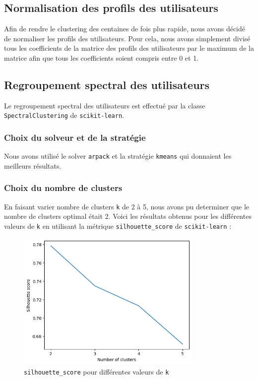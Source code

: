 \documentclass{article}
\begin{document}
\subsection{Normalisation des profils des utilisateurs}
Afin de rendre le clustering des centaines de fois plus rapide, nous avons
décidé de normaliser les profils des utilisateurs. Pour cela, nous avons
simplement divisé tous les coefficients de la matrice des profils des utilisateurs
par le maximum de la matrice afin que tous les coefficients soient compris
entre 0 et 1.

\subsection{Regroupement spectral des utilisateurs}
Le regroupement spectral des utilisateurs est effectué par la classe
\texttt{SpectralClustering} de \texttt{scikit-learn}. 

\subsubsection{Choix du solveur et de la stratégie}
Nous avons utilisé le solver
\texttt{arpack} et la stratégie \texttt{kmeans} qui donnaient les meilleurs
résultats.

\subsubsection{Choix du nombre de clusters}
En faisant varier nombre de clusters \texttt{k} de 2 à 5, nous avons pu determiner
que le nombre de clusters optimal était 2. Voici les résultats obtenus pour
les différentes valeurs de \texttt{k} en utilisant la métrique \texttt{silhouette\_score}
de \texttt{scikit-learn} :

\begin{figure}[ht]
  \centering
  \includegraphics[width=0.8\textwidth]{img/silhouette_graph_k.png}
  \caption{\texttt{silhouette\_score} pour différentes valeurs de \texttt{k}}
\end{figure}
\newpage
\end{document}

